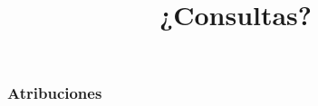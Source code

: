 \documentclass[11pt,a4paper,spanish]{beamer}
\begin{document}
\begin{frame}

\title{¿Consultas?}
\maketitle

\end{frame}

\setcounter{lastPage}{\number\value{page}}

\begin{frame}%

\frametitle{Atribuciones}


\tiny

\end{frame}

\setcounter{page}{\number\value{lastPage}}
\end{document}
